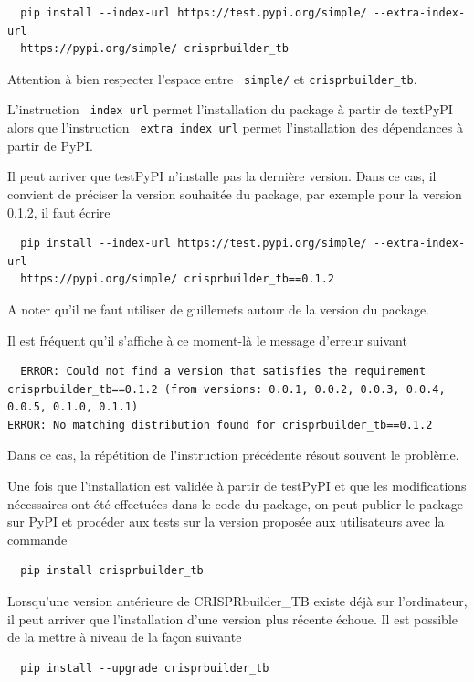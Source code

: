 \documentclass[twoside,a4paper,11pt,frenchb,openany]{report}
\begin{document}
\begin{verbatim}  pip install --index-url https://test.pypi.org/simple/ --extra-index-url 
  https://pypi.org/simple/ crisprbuilder_tb\end{verbatim} 

Attention à bien respecter l'espace entre \texttt{ simple/} et \texttt{crisprbuilder\_tb}.

L'instruction \texttt{ \textemdash \textemdash index \textemdash url} permet l'installation du package à partir de textPyPI alors que l'instruction \texttt{ \textemdash \textemdash extra \textemdash index \textemdash url} permet l'installation des dépendances à partir de PyPI.

Il peut arriver que testPyPI n'installe pas la dernière version. Dans ce cas, il convient de préciser la version souhaitée du package, par exemple pour la version 0.1.2, il faut écrire

\begin{verbatim}  pip install --index-url https://test.pypi.org/simple/ --extra-index-url 
  https://pypi.org/simple/ crisprbuilder_tb==0.1.2\end{verbatim} 

A noter qu'il ne faut utiliser de guillemets autour de la version du package.

Il est fréquent qu'il s'affiche à ce moment-là le message d'erreur suivant

\begin{verbatim}  ERROR: Could not find a version that satisfies the requirement crisprbuilder_tb==0.1.2 (from versions: 0.0.1, 0.0.2, 0.0.3, 0.0.4, 0.0.5, 0.1.0, 0.1.1)
ERROR: No matching distribution found for crisprbuilder_tb==0.1.2\end{verbatim}

Dans ce cas, la répétition de l'instruction précédente résout souvent le problème.

Une fois que l'installation est validée à partir de testPyPI et que les modifications nécessaires ont été effectuées dans le code du package, on peut publier le package sur PyPI et procéder aux tests sur la version proposée aux utilisateurs avec la commande

\begin{verbatim}
  pip install crisprbuilder_tb
\end{verbatim}

Lorsqu'une version antérieure de CRISPRbuilder\_TB existe déjà sur l'ordinateur, il peut arriver que l'installation d'une version plus récente échoue. Il est possible de la mettre à niveau de la façon suivante
\begin{verbatim}
  pip install --upgrade crisprbuilder_tb
\end{verbatim}
\end{document}
